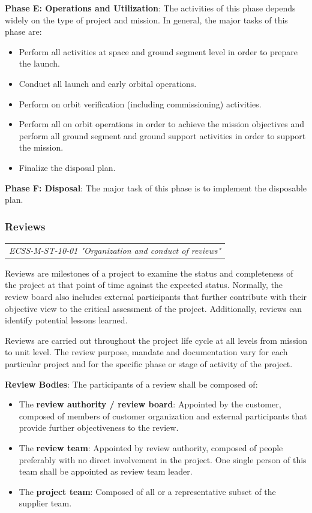 \textbf{Phase E: Operations and Utilization}: The activities of this phase depends widely on the type of project and mission. In general, the major tasks of this phase are:
\begin{itemize}
\item Perform all activities at space and ground segment level in order to prepare the launch.
\item Conduct all launch and early orbital operations.
\item Perform on orbit verification (including commissioning) activities.
\item Perform all on orbit operations in order to achieve the mission objectives and perform all ground segment and ground support activities in order to support the mission.
\item Finalize the disposal plan.
\end{itemize}

\textbf{Phase F: Disposal}: The major task of this phase is to implement the disposable plan.

\subsubsection{Reviews}

\begin{tabular}{l}
\textit{ECSS-M-ST-10-01 "Organization and conduct of reviews" \cite{ECSS-M-ST-10-01}} 
\end{tabular}

Reviews are milestones of a project to examine the status and completeness of the project at that point of time against the expected status. Normally, the review board also includes external participants that further contribute with their objective view to the critical assessment of the project. Additionally, reviews can identify potential lessons learned.

Reviews are carried out throughout the project life cycle at all levels from mission to unit level. The review purpose, mandate and documentation vary for each particular project and for the specific phase or stage of activity of the project. 

\textbf{Review Bodies}: The participants of a review shall be composed of:
\begin{itemize}
\item The \textbf{review authority / review board}: Appointed by the customer, composed of members of customer organization and external participants that provide further objectiveness to the review.
\item The \textbf{review team}: Appointed by review authority, composed of people preferably with no direct involvement in the project. One single person of this team shall be appointed as review team leader.
\item The \textbf{project team}: Composed of all or a representative subset of the supplier team.
\end{itemize}

